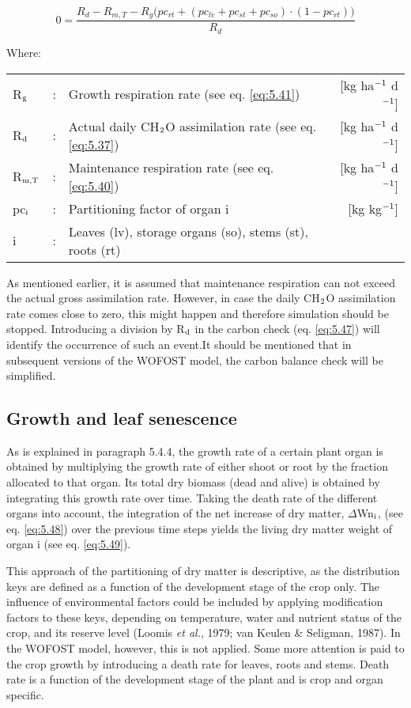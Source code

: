 \begin{equation}
\label{eq:5.47}
0 = {\frac{R_{d} - R_{m,T} - R_{g} \big( pc_{rt} + (pc_{lv} + pc_{st} + pc_{so}) \cdot (1 - pc_{rt}) \big) }{R_d}}  
\end{equation}

Where:\\[5pt]
\begin{tabularx}{\textwidth}{llXr}
R$_{{\rm g}}$ &:& Growth respiration rate (see eq. \ref{eq:5.41})   &
     [kg ha$^{{\rm -1}}$ d$^{{\rm -1}}$]\\
R$_{{\rm d}}$ &:& Actual daily CH$_{{\rm 2}}$O assimilation rate (see eq. \ref{eq:5.37})   &
     [kg ha$^{{\rm -1}}$ d$^{{\rm -1}}$]\\
R$_{{\rm m,T}}$ &:& Maintenance respiration rate (see eq. \ref{eq:5.40})   &
     [kg ha$^{{\rm -1}}$ d$^{{\rm -1}}$]\\
pc$_{{\rm i}}$ &:& Partitioning factor of organ i    &
     [kg kg$^{{\rm -1}}$]\\
i &:& Leaves (lv), storage organs (so), stems (st), roots (rt)\\
\end{tabularx}

As mentioned earlier, it is assumed that maintenance respiration can not exceed the actual
gross assimilation rate. However, in case the daily CH$_{{\rm 2}}$O assimilation rate comes close to
zero, this might happen and therefore simulation should be stopped. Introducing a
division by R$_{{\rm d}}$ in the carbon check (eq. \ref{eq:5.47}) will identify the occurrence of such an
event.It should be mentioned that in subsequent versions of the WOFOST model, the carbon
balance check will be simplified.

\subsection{Growth and leaf senescence  }
\label{sec:5.4.5}
As is explained in paragraph 5.4.4, the growth rate of a certain plant organ is obtained by
multiplying the growth rate of either shoot or root by the fraction allocated to that organ.
Its total dry biomass (dead and alive) is obtained by integrating this growth rate over
time. Taking the death rate of the different organs into account, the integration of the net
increase of dry matter, $\Delta$Wn$_{{\rm i}}$, (see eq. \ref{eq:5.48}) over the previous time steps 
yields the living dry matter weight of organ i (see eq. \ref{eq:5.49}).

This approach of the partitioning of dry matter is descriptive, as the distribution keys are
defined as a function of the development stage of the crop only. The influence of
environmental factors could be included by applying modification factors to these keys,
depending on temperature, water and nutrient status of the crop, and its reserve level
(Loomis {\it et al.}, 1979; van Keulen \& Seligman, 1987). In the WOFOST model, however,
this is not applied. Some more attention is paid to the crop growth by introducing a death
rate for leaves, roots and stems. Death rate is a function of the development stage of the
plant and is crop and organ specific.

